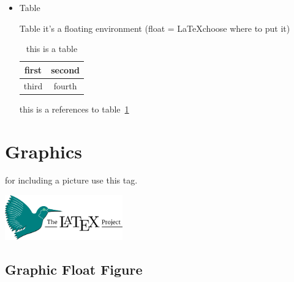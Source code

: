 \documentclass{article} %
\begin{document}
\begin{itemize}
    \item Table
    
    \smallskip
    Table it's a floating environment (float = \LaTeX \space choose where to put it)
    
    \begin{table}[htb]
        \centering
        \begin{tabular}{c|c}
         first    &    second\\
        \hline
         third    &    fourth
        \end{tabular}
        
        \caption{this is a table}
        \label{tab:table}
    \end{table}
    
    this is a references to table~\ref{tab:table}
    
    
\end{itemize}

\section{Graphics}

    for including a picture use this tag.
    
    \includegraphics[width=2in]{latex.png}

    \subsection{Graphic Float Figure}
    
\end{document}
